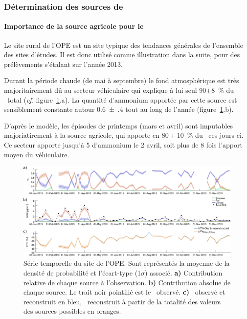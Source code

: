 \subsubsection{Détermination des sources de \NHq}%
\label{ssub:determination_des_sources_de_NHq}

\paragraph{Importance de la source agricole pour le \NHq}%
\label{par:importance_de_la_source_agricole_pour_le_nhq}

Le site rural de l'OPE est un site typique des tendances générales de l'ensemble des sites
d'études.
Il est donc utilisé comme illustration dans la suite, pour des prélèvements s'étalant sur
l'année 2013.

Durant la période chaude (de mai à septembre) le fond atmosphérique est très
majoritairement dû au secteur véhiculaire qui explique à lui seul 90$\pm$8~\% du
\NHq~total (\textit{cf.} figure~\ref{fig:timeSerieOPE}.a).
La quantité d'ammonium apportée par cette source est sensiblement constante autour
\SI{0.6(4)}{\ugm} tout au long de l'année (figure~\ref{fig:timeSerieOPE}.b).

D'après le modèle, les épisodes de printemps (mars et avril) sont imputables
majoriatirement à la source agricole, qui apporte en $80\pm10$~\% du \NHq~ces jours ci.
Ce secteur apporte jusqu'à \SI{5}{\ugm} d'ammonium le 2 avril, soit plus de 8 fois
l'apport moyen du véhiculaire.

\begin{figure}[ht]
    \centering
    \includegraphics[width=1.0\linewidth]{figures/INACS/MCA_OPE_S3-BioFerVeh_e-30_timeSerie2013.pdf}
    \caption{Série temporelle du site de l'OPE. Sont représentés la moyenne de la densité
        de probabilité et l'écart-type (1$\sigma$) associé. \textbf{a)} Contribution relative
        de chaque source à l'observation. \textbf{b)} Contribution absolue de chaque source. Le
        trait noir pointillé est le \NHq~observé. \textbf{c)} \dN~observé et reconstruit en bleu,
        \dN~reconstruit à partir de la totalité des valeurs des sources possibles en oranges.
    }
    \label{fig:timeSerieOPE}
\end{figure}

